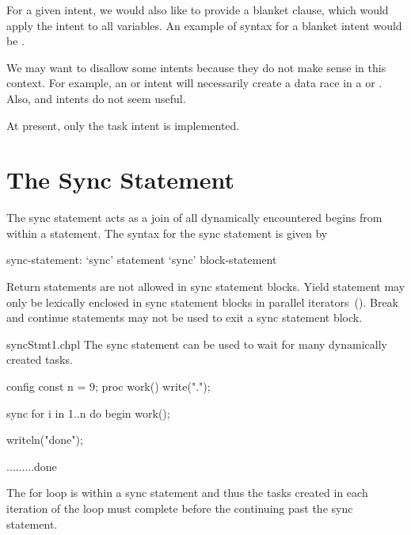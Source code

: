 \begin{future}
For a given intent, we would also like to provide a blanket clause,
which would apply the intent to all variables.
An example of syntax for a blanket  intent would be .
\end{future}

\begin{future}
We may want to disallow some intents because they do not make sense
in this context. For example, an  or  intent
will necessarily create a data race in a  or .
Also,  and  intents do not seem useful.
\end{future}

\begin{craychapel}
At present, only the  task intent is implemented.
\end{craychapel}


\section{The Sync Statement}
\label{Sync_Statement}

The sync statement acts as a join of all dynamically encountered
begins from within a statement.  The syntax for the sync statement is
given by
\begin{syntax}
sync-statement:
  `sync' statement
  `sync' block-statement
\end{syntax}

Return statements are not allowed in sync statement blocks.  Yield
statement may only be lexically enclosed in sync statement blocks in
parallel iterators~().  Break and continue
statements may not be used to exit a sync statement block.

\begin{chapelexample}{syncStmt1.chpl}
The sync statement can be used to wait for many dynamically created
tasks.
\begin{chapelpre}
config const n = 9;
proc work() {
  write(".");
}
\end{chapelpre}
\begin{chapel}
sync for i in 1..n do begin work();
\end{chapel}
\begin{chapelpost}
writeln("done");
\end{chapelpost}
\begin{chapeloutput}
.........done
\end{chapeloutput}
The for loop is within a sync statement and thus the tasks created
in each iteration of the loop must complete before the continuing past
the sync statement.
\end{chapelexample}

